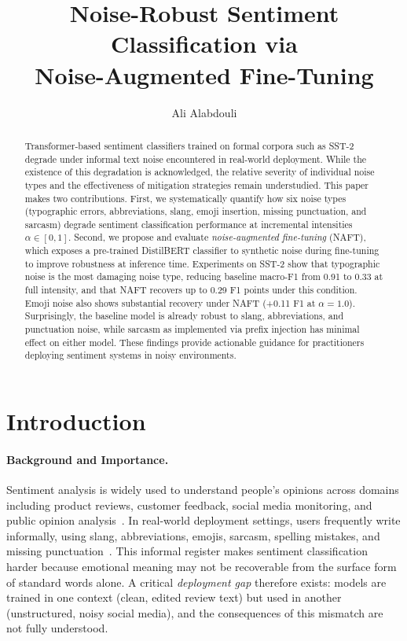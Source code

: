 \documentclass[sigconf]{acmart}
\title{Noise-Robust Sentiment Classification via\\
Noise-Augmented Fine-Tuning}
\author{Ali Alabdouli}
\affiliation{\institution{Deakin University}\country{Australia}}
\begin{document}
\begin{abstract}
Transformer-based sentiment classifiers trained on formal corpora
such as SST-2 degrade under informal text noise encountered in
real-world deployment.
While the existence of this degradation is acknowledged, the
relative severity of individual noise types and the effectiveness
of mitigation strategies remain understudied.
This paper makes two contributions.
First, we systematically quantify how six noise types (typographic
errors, abbreviations, slang, emoji insertion, missing punctuation,
and sarcasm) degrade sentiment classification performance at
incremental intensities $\alpha \in [0, 1]$.
Second, we propose and evaluate \emph{noise-augmented fine-tuning}
(NAFT), which exposes a pre-trained DistilBERT classifier to
synthetic noise during fine-tuning to improve robustness at
inference time.
Experiments on SST-2 show that typographic noise is the most
damaging noise type, reducing baseline macro-F1 from 0.91 to 0.33
at full intensity, and that NAFT recovers up to 0.29 F1 points
under this condition.
Emoji noise also shows substantial recovery under NAFT (+0.11 F1
at $\alpha=1.0$).
Surprisingly, the baseline model is already robust to slang,
abbreviations, and punctuation noise, while sarcasm as implemented
via prefix injection has minimal effect on either model.
These findings provide actionable guidance for practitioners
deploying sentiment systems in noisy environments.
\end{abstract}

\maketitle

\section{Introduction}

\paragraph{Background and Importance.}
Sentiment analysis is widely used to understand people's opinions
across domains including product reviews, customer feedback, social
media monitoring, and public opinion analysis~\cite{pang2008opinion}.
In real-world deployment settings, users frequently write
informally, using slang, abbreviations, emojis, sarcasm, spelling
mistakes, and missing punctuation~\cite{eisenstein2013bad}.
This informal register makes sentiment classification harder because
emotional meaning may not be recoverable from the surface form of
standard words alone.
A critical \emph{deployment gap} therefore exists: models are trained
in one context (clean, edited review text) but used in another
(unstructured, noisy social media), and the consequences of this
mismatch are not fully understood.
\end{document}
